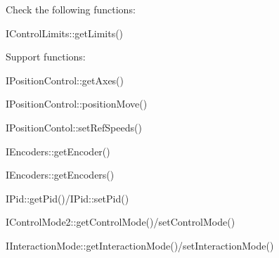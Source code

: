 Check the following functions\-: \begin{DoxyItemize}
\item I\-Control\-Limits\-::get\-Limits()\end{DoxyItemize}
Support functions\-: \begin{DoxyItemize}
\item I\-Position\-Control\-::get\-Axes() \item I\-Position\-Control\-::position\-Move() \item I\-Position\-Contol\-::set\-Ref\-Speeds() \item I\-Encoders\-::get\-Encoder() \item I\-Encoders\-::get\-Encoders() \item I\-Pid\-::get\-Pid()/\-I\-Pid\-::set\-Pid() \item I\-Control\-Mode2\-::get\-Control\-Mode()/set\-Control\-Mode() \item I\-Interaction\-Mode\-::get\-Interaction\-Mode()/set\-Interaction\-Mode()\end{DoxyItemize}
